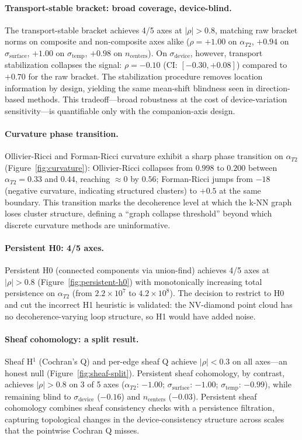 \documentclass[11pt]{article}
\begin{document}
\paragraph{Transport-stable bracket: broad coverage, device-blind.}
The transport-stable bracket achieves 4/5 axes at $|\rho| > 0.8$,
matching raw bracket norms on composite and non-composite axes alike
($\rho = +1.00$ on $\alpha_{T2}$, $+0.94$ on $\sigma_\text{surface}$,
$+1.00$ on $\sigma_\text{temp}$, $+0.98$ on $n_\text{centers}$).  On
$\sigma_\text{device}$, however, transport stabilization collapses the
signal: $\rho = -0.10$ (CI: $[-0.30, +0.08]$) compared to $+0.70$ for
the raw bracket.  The stabilization procedure removes location
information by design, yielding the same mean-shift blindness seen in
direction-based methods.  This tradeoff---broad robustness at the cost
of device-variation sensitivity---is quantifiable only with the
companion-axis design.

\paragraph{Curvature phase transition.}
Ollivier-Ricci and Forman-Ricci curvature exhibit a sharp phase
transition on $\alpha_{T2}$ (Figure~\ref{fig:curvature}): Ollivier-Ricci collapses from $0.998$ to
$0.200$ between $\alpha_{T2} = 0.33$ and $0.44$, reaching $\approx 0$
by $0.56$; Forman-Ricci jumps from $-18$ (negative curvature,
indicating structured clusters) to $+0.5$ at the same boundary.  This
transition marks the decoherence level at which the k-NN graph loses
cluster structure, defining a ``graph collapse threshold'' beyond which
discrete curvature methods are uninformative.

\paragraph{Persistent H0: 4/5 axes.}
Persistent H0 (connected components via union-find) achieves 4/5 axes
at $|\rho| > 0.8$ (Figure~\ref{fig:persistent-h0}) with monotonically increasing total persistence on
$\alpha_{T2}$ (from $2.2 \times 10^7$ to $4.2 \times 10^8$).  The
decision to restrict to H0 and cut the incorrect H1 heuristic is
validated: the NV-diamond point cloud has no decoherence-varying loop
structure, so H1 would have added noise.

\paragraph{Sheaf cohomology: a split result.}
Sheaf H$^1$ (Cochran's Q) and per-edge sheaf Q achieve $|\rho| < 0.3$
on all axes---an honest null (Figure~\ref{fig:sheaf-split}).
Persistent sheaf cohomology, by contrast, achieves
$|\rho| > 0.8$ on 3 of 5 axes ($\alpha_{T2}$: $-1.00$;
$\sigma_\text{surface}$: $-1.00$; $\sigma_\text{temp}$: $-0.99$),
while remaining blind to $\sigma_\text{device}$ ($-0.16$) and
$n_\text{centers}$ ($-0.03$).  Persistent sheaf cohomology combines
sheaf consistency checks with a persistence filtration, capturing
topological changes in the device-consistency structure across scales
that the pointwise Cochran Q misses.
\end{document}

